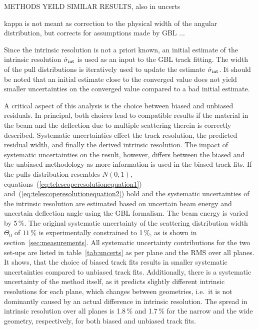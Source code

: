METHODS YEILD SIMILAR RESULTS, also in uncerts

kappa is not meant as correction to the physical width of the angular distribution, but corrects for assumptions made by GBL ...

Since the intrinsic resolution is not a priori known, an initial estimate of the intrinsic resolution $\hat{\sigma}_{\textrm{int}}$ is used as an input to the GBL track fitting. 
The width of the pull distributions is iteratively used to update the estimate $\hat{\sigma}_{\textrm{int}}$.
It should be noted that an initial estimate close to the converged value does not yield smaller uncertainties on the converged value compared to a bad initial estimate.

A critical aspect of this analysis is the choice between biased and unbiased residuals. 
In principal, both choices lead to compatible results if the material in the beam and the deflection due to multiple scattering therein is correctly described. 
Systematic uncertainties effect the track resolution, the predicted residual width, and finally the derived intrinsic resolution. 
The impact of systematic uncertainties on the result, however, differs between the biased and the unbiased methodology as more information is used in the biased track fits. 
If the pulls distribution resembles $N(0,1)$, equations~(\ref{eq:telescoperesolutionequation1}) and~(\ref{eq:telescoperesolutionequation2}) hold and the systematic uncertainties of the intrinsic resolution
 are estimated based on uncertain beam energy and uncertain deflection angle using the GBL formalism. 
The beam energy is varied by 5\,\%. 
The original systematic uncertainty of the scattering distribution width $\Theta_{0}$ of $11\,\%$ is experimentally constrained to 1\,\%, as is shown in section~\ref{sec:measurements}. 
All systematic uncertainty contributions for the two set-ups are listed in table~\ref{tab:uncerts} as per plane and the RMS over all planes. 
It shows, that the choice of biased track fits results in smaller systematic uncertainties compared to unbiased track fits. 
Additionally, there is a systematic uncertainty of the method itself, as it predicts slightly different intrinsic resolutions for each plane, which changes between geometries,
 i.e.\ it is not dominantly caused by an actual difference in intrinsic resolution. 
The spread in intrinsic resolution over all planes is 1.8\,\% and 1.7\,\% for the narrow and the wide geometry, respectively, for both biased and unbiased track fits. 

